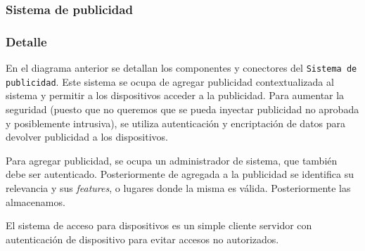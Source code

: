 \subsubsection{Sistema de publicidad}


\subsubsection{Detalle}

En el diagrama anterior se detallan los componentes y conectores del
\texttt{Sistema de publicidad}. Este sistema se ocupa de agregar
publicidad contextualizada al sistema y permitir a los dispositivos
acceder a la publicidad. Para aumentar la seguridad (puesto que no
queremos que se pueda inyectar publicidad no aprobada y posiblemente
intrusiva), se utiliza autenticación y encriptación de datos para
devolver publicidad a los dispositivos.

Para agregar publicidad, se ocupa un administrador de sistema, que
también debe ser autenticado. Posteriormente de agregada a la 
publicidad se identifica su relevancia y sus \textit{features}, o
lugares donde la misma es válida. Posteriormente las almacenamos.

El sistema de acceso para dispositivos es un simple cliente servidor
con autenticación de dispositivo para evitar accesos no autorizados.
